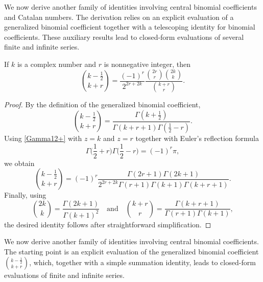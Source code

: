 \documentclass[12pt,reqno]{article}
\begin{document}
We now derive another family of identities involving central binomial coefficients and Catalan numbers. The derivation relies on an explicit evaluation of a generalized binomial coefficient together with a telescoping identity for binomial coefficients. These auxiliary results lead to closed-form evaluations of several finite and infinite series.
\begin{lemma}\label{zd6f3yu}
	If $k$ is a complex number and $r$ is nonnegative integer, then
	\begin{equation*}
	\binom{{k - \frac12}}{{k + r}} = \frac{( - 1)^r}{ 2^{2r+2k}} \frac{\binom{{2r}}{r} \binom{{2k}}{k}}{\binom{{k + r}}{r}}.
	\end{equation*}
\end{lemma}
\begin{proof}
By the definition of the generalized binomial coefficient,
\[ 
\binom{k-\frac12}{k+r} = \frac{\Gamma\!\left(k+\frac12\right)}{\Gamma(k+r+1)\Gamma\!\left(\frac12-r\right)}.
\]
Using \eqref{Gamma12+} with $z=k$ and $z=r$ together with Euler's reflection formula
$$\Gamma\Big(\frac12+r\Big) \Gamma\Big(\frac12-r\Big) = (-1)^r\pi,$$
we obtain
$$\binom{k-\frac12}{k+r} = (-1)^r \frac{\Gamma(2r+1)\Gamma(2k+1)}{2^{2r+2k}\Gamma(r+1)\Gamma(k+1)\Gamma(k+r+1)}.$$
Finally, using
$$\binom{2k}{k}=\frac{\Gamma(2k+1)}{\Gamma(k+1)^2}\quad \text{and}\quad
\binom{k+r}{r}=\frac{\Gamma(k+r+1)}{\Gamma(r+1)\Gamma(k+1)},$$ the desired identity follows after straightforward simplification.
\end{proof}

We now derive another family of identities involving central binomial coefficients. The starting point is an explicit evaluation of the generalized binomial coefficient $\binom{k-\frac12}{k+r}$, which, together with a simple summation identity, leads to closed-form evaluations of finite and infinite series.
\end{document}
